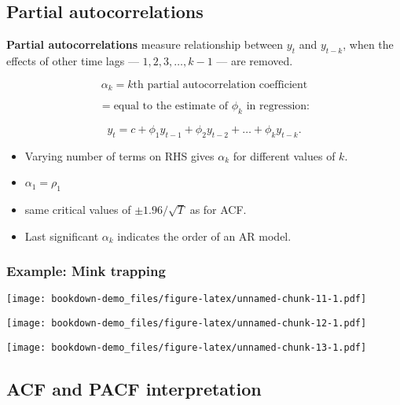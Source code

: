 \documentclass[]{book}
\newenvironment{Shaded}{\begin{snugshade}}{\end{snugshade}}
\newcommand{\DataTypeTok}[1]{\textcolor[rgb]{0.13,0.29,0.53}{#1}}
\newcommand{\KeywordTok}[1]{\textcolor[rgb]{0.13,0.29,0.53}{\textbf{#1}}}
\newcommand{\NormalTok}[1]{#1}
\newcommand{\OperatorTok}[1]{\textcolor[rgb]{0.81,0.36,0.00}{\textbf{#1}}}
\newcommand{\StringTok}[1]{\textcolor[rgb]{0.31,0.60,0.02}{#1}}
\providecommand{\tightlist}{%
  \setlength{\itemsep}{0pt}\setlength{\parskip}{0pt}}
\begin{document}
\hypertarget{partial-autocorrelations}{%
\subsection{Partial autocorrelations}\label{partial-autocorrelations}}

\textbf{Partial autocorrelations} measure relationship between \(y_{t}\) and \(y_{t - k}\), when the effects of other time lags --- \(1, 2, 3, \dots, k - 1\) --- are removed.

\[\alpha_k = k \text{th partial autocorrelation coefficient}\]

\[= \text{equal to the estimate of } \phi_k \text{ in regression:}\]

\[y_t = c + \phi_1 y_{t-1} + \phi_2 y_{t-2} + \dots + \phi_k y_{t-k}.\]

\begin{itemize}
\tightlist
\item
  Varying number of terms on RHS gives \(\alpha_k\) for different values of \(k\).
\item
  \(\alpha_1=\rho_1\)
\item
  same critical values of \(\pm 1.96/\sqrt{T}\) as for ACF.
\item
  Last significant \(\alpha_k\) indicates the order of an AR model.
\end{itemize}

\hypertarget{example-mink-trapping}{%
\subsubsection{Example: Mink trapping}\label{example-mink-trapping}}

\texttt{[image: bookdown-demo\_files/figure-latex/unnamed-chunk-11-1.pdf]}

\texttt{[image: bookdown-demo\_files/figure-latex/unnamed-chunk-12-1.pdf]}

\begin{Shaded}
\end{Shaded}

\texttt{[image: bookdown-demo\_files/figure-latex/unnamed-chunk-13-1.pdf]}

\hypertarget{acf-and-pacf-interpretation}{%
\subsection{ACF and PACF interpretation}\label{acf-and-pacf-interpretation}}
\end{document}
